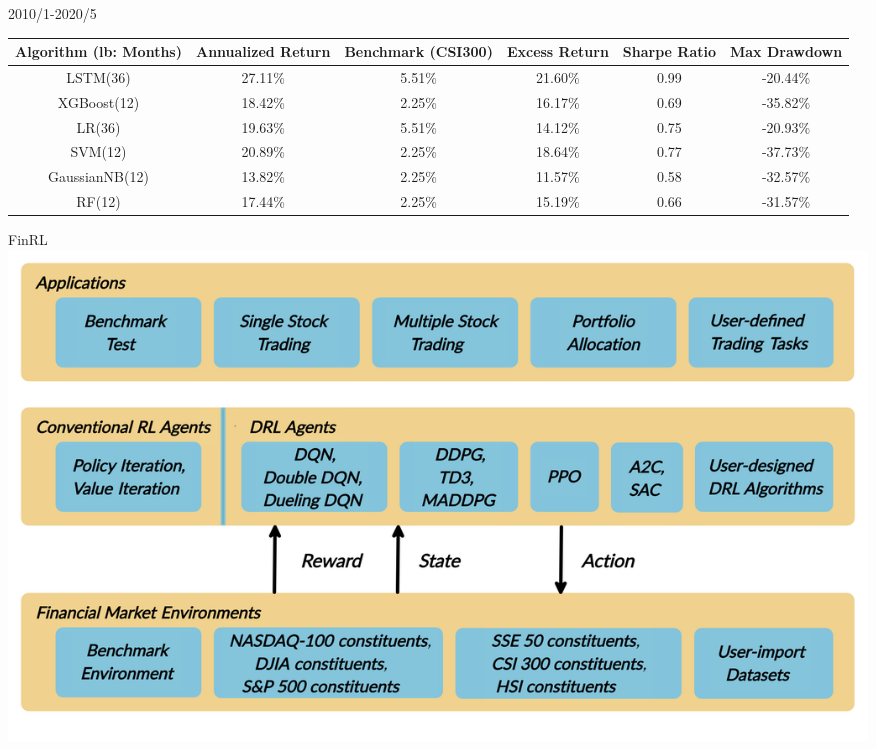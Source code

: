 \documentclass[aspectratio=169,11pt]{beamer}
\begin{document}
    \begin{frame}{2010/1-2020/5}
        \centering
        \begin{tabulary}{\linewidth}{CCCCCC}
            \toprule
            \toprule
            \textbf{Algorithm (lb: Months)}& \textbf{Annualized Return}& \textbf{Benchmark (CSI300)}& \textbf{Excess Return}& \textbf{Sharpe Ratio}& \textbf{Max Drawdown}\\
            \midrule
            LSTM(36)& 27.11\%& 5.51\%& 21.60\%& 0.99& -20.44\%\\
            XGBoost(12)& 18.42\%& 2.25\%& 16.17\%& 0.69& -35.82\%\\
            LR(36)& 19.63\%& 5.51\%& 14.12\%& 0.75& -20.93\%\\
            SVM(12)& 20.89\%& 2.25\%& 18.64\%& 0.77& -37.73\%\\
            GaussianNB(12)& 13.82\%& 2.25\%& 11.57\%& 0.58& -32.57\%\\
            RF(12)& 17.44\%& 2.25\%& 15.19\%& 0.66& -31.57\%\\
            \bottomrule
            \bottomrule
        \end{tabulary}
    \end{frame}

    \begin{frame}{FinRL}
        \centering
        \includegraphics[width=0.8\linewidth]{FinRL-Architecture.png}
    \end{frame}
\end{document}
